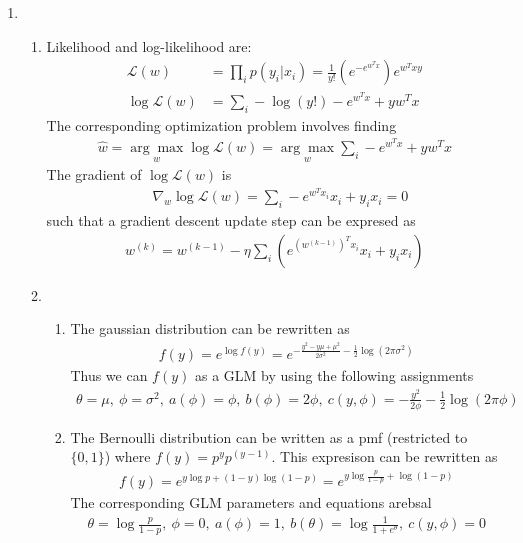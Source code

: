 \documentclass[11pt,letter]{article}
\begin{document}
\begin{enumerate}
\item \begin{enumerate}
    \item Likelihood and log-likelihood are:
    \begin{align*}
        \mathcal L(w) & = \prod_i p(y_i | x_i) = \frac{1}{y!}(e^{-e^{w^Tx}})e^{w^Txy} \\
        \log \mathcal L(w) & = \sum_i -\log(y!) - e^{w^Tx} + yw^Tx
    \end{align*}
    The corresponding optimization problem involves finding
    \begin{align*}
        \hat w = \underset{w}{\arg \max} \log \mathcal L(w) = \underset{w}{\arg \max} \sum_i - e^{w^Tx} + yw^Tx
    \end{align*}
    The gradient of $\log \mathcal L(w)$ is
    \begin{align*}
        & \nabla_w \log \mathcal L(w) = \sum_i -e^{w^Tx_i}x_i + y_ix_i = 0
    \end{align*}
    such that a gradient descent update step can be expresed as
    \begin{align*}
        w^{(k)} = w^{(k-1)} - \eta \sum_i (e^{(w^{(k-1)})^Tx_i}x_i + y_ix_i)
    \end{align*}
    \item \begin{enumerate}
        \item The gaussian distribution can be rewritten as
        \begin{align*}
            f(y) = e^{\log f(y)} = e^{-\frac{y^2 - y\mu + \mu^2}{2\sigma^2} - \frac{1}{2} \log(2\pi\sigma^2)}
        \end{align*}
        Thus we can $f(y)$ as a GLM by using the following assignments
        \begin{align*}
            \theta = \mu, \ \phi = \sigma^2, \ a(\phi) = \phi, \ b(\phi) = 2\phi, \ c(y,\phi) = -\frac{y^2}{2\phi} - \frac{1}{2}\log(2\pi\phi)
        \end{align*}
        \item The Bernoulli distribution can be written as a pmf (restricted to $\{0,1\}$) where $f(y) = p^yp^{(y-1)}$. This expresison can be rewritten as
        \begin{align*}
            f(y) = e^{y \log p + (1-y) \log (1-p)} = e^{y \log \frac{p}{1-p} + \log (1-p)}
        \end{align*}
        The corresponding GLM parameters and equations arebsal
        \begin{align*}
            \theta = \log \frac{p}{1-p}, \ \phi = 0, \ a(\phi) = 1, \ b(\theta) = \log \frac{1}{1+e^\theta}, \ c(y,\phi) = 0

\end{align*}
\end{enumerate}
\end{enumerate}
\end{enumerate}
\end{document}

